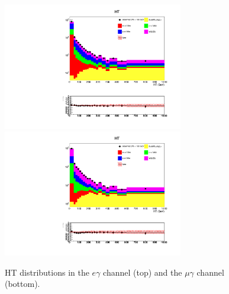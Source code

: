 \documentclass[thesis.tex]{subfiles}
\renewcommand\_{\textunderscore\allowbreak}
\begin{document}
\begin{figure}[hbtp]
  \centering
    \includegraphics[width=0.7\textwidth]{Figures/VALID_egamma_2016ReMiniAOD_HT.pdf} \\
    \includegraphics[width=0.7\textwidth]{Figures/VALID_mg_2016ReMiniAOD_HT.pdf} 
  \caption{HT distributions in the $e\gamma$ channel (top) and the $\mu\gamma$ channel (bottom).}
    \label{fig:htvalidation}
\end{figure}
\end{document}
